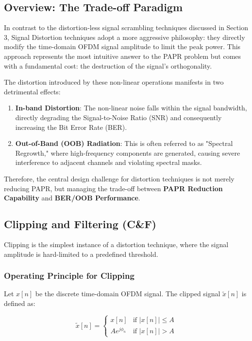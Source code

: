 \documentclass[journal]{IEEEtran}
\begin{document}
\subsection{Overview: The Trade-off Paradigm}
In contrast to the distortion-less signal scrambling techniques discussed in Section 3, Signal Distortion techniques adopt a more aggressive philosophy: they directly modify the time-domain OFDM signal amplitude to limit the peak power. This approach represents the most intuitive answer to the PAPR problem but comes with a fundamental cost: the destruction of the signal's orthogonality.

The distortion introduced by these non-linear operations manifests in two detrimental effects:

\begin{enumerate}
    \item \textbf{In-band Distortion}: The non-linear noise falls within the signal bandwidth, directly degrading the Signal-to-Noise Ratio (SNR) and consequently increasing the Bit Error Rate (BER).
    \item \textbf{Out-of-Band (OOB) Radiation}: This is often referred to as "Spectral Regrowth," where high-frequency components are generated, causing severe interference to adjacent channels and violating spectral masks.
\end{enumerate}

Therefore, the central design challenge for distortion techniques is not merely reducing PAPR, but managing the trade-off between \textbf{PAPR Reduction Capability} and \textbf{BER/OOB Performance}.

\subsection{Clipping and Filtering (C\&F)}
Clipping is the simplest instance of a distortion technique, where the signal amplitude is hard-limited to a predefined threshold.

\subsubsection{Operating Principle for Clipping}
Let $x[n]$ be the discrete time-domain OFDM signal. The clipped signal $\tilde{x}[n]$ is defined as:

\begin{equation}
    \tilde{x}[n] = \begin{cases}
        x[n]          & \text{if } |x[n]| \le A \\
        A e^{j\phi_n} & \text{if } |x[n]| > A
    \end{cases}
\end{equation}
\end{document}

